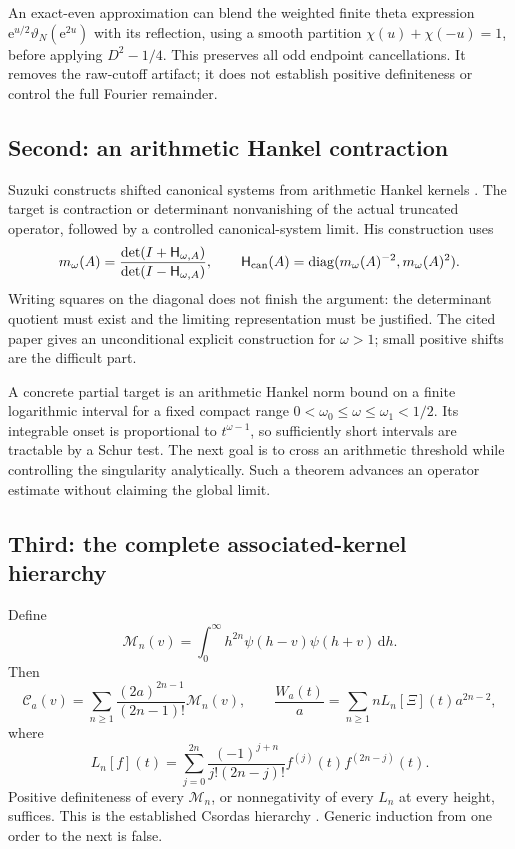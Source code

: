 \documentclass[11pt,letterpaper]{article}
\numberwithin{equation}{section}
\theoremstyle{remark}\newtheorem{remark}[proposition]{Remark}
\newcommand{\dd}{\,\mathrm d}
\newcommand{\calC}{\mathcal C}
\newcommand{\calM}{\mathcal M}
\newcommand{\ee}{\mathrm e}
\begin{document}
An exact-even approximation can blend the weighted finite theta expression
$\ee^{u/2}\vartheta_N(\ee^{2u})$ with its reflection, using a smooth partition
$\chi(u)+\chi(-u)=1$, before applying $D^2-1/4$. This preserves all odd endpoint cancellations. It removes the raw-cutoff artifact; it does not establish positive definiteness or control the full Fourier remainder.

\subsection{Second: an arithmetic Hankel contraction}
Suzuki constructs shifted canonical systems from arithmetic Hankel kernels \cite{suzuki}. The target is contraction or determinant nonvanishing of the actual truncated operator, followed by a controlled canonical-system limit. His construction uses
\[
 m_\omega(A)=\frac{\det(I+\mathsf H_{\omega,A})}
                  {\det(I-\mathsf H_{\omega,A})},
 \qquad
 \mathsf H_{\rm can}(A)=
 \operatorname{diag}(m_\omega(A)^{-2},m_\omega(A)^2).
\]
Writing squares on the diagonal does not finish the argument: the determinant quotient must exist and the limiting representation must be justified. The cited paper gives an unconditional explicit construction for $\omega>1$; small positive shifts are the difficult part.

A concrete partial target is an arithmetic Hankel norm bound on a finite logarithmic interval for a fixed compact range
$0<\omega_0\le\omega\le\omega_1<1/2$. Its integrable onset is proportional to $t^{\omega-1}$, so sufficiently short intervals are tractable by a Schur test. The next goal is to cross an arithmetic threshold while controlling the singularity analytically. Such a theorem advances an operator estimate without claiming the global limit.

\subsection{Third: the complete associated-kernel hierarchy}
Define
\[
 \calM_n(v)=\int_0^\infty h^{2n}\psi(h-v)\psi(h+v)\dd h.
\]
Then
\[
 \calC_a(v)=\sum_{n\ge1}\frac{(2a)^{2n-1}}{(2n-1)!}\calM_n(v),
 \qquad
 \frac{W_a(t)}a=\sum_{n\ge1}nL_n[\Xi](t)a^{2n-2},
\]
where
\[
 L_n[f](t)=\sum_{j=0}^{2n}
 \frac{(-1)^{j+n}}{j!(2n-j)!}f^{(j)}(t)f^{(2n-j)}(t).
\]
Positive definiteness of every $\calM_n$, or nonnegativity of every $L_n$ at every height, suffices. This is the established Csordas hierarchy \cite{csordas,cv}. Generic induction from one order to the next is false.
\end{document}
